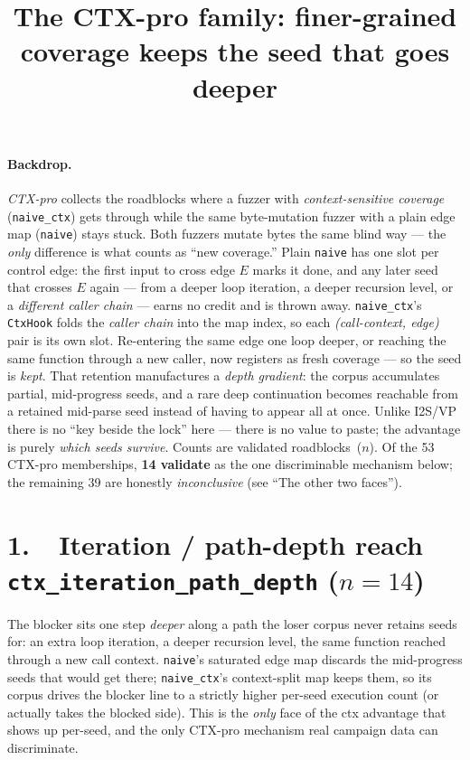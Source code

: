 \documentclass[11pt]{article}
\title{\textbf{The CTX-pro family: finer-grained coverage keeps the seed that goes deeper}}
\author{}
\date{}
\begin{document}
\maketitle
\vspace{-3em}

\paragraph{Backdrop.} \emph{CTX-pro} collects the roadblocks where a fuzzer with
\emph{context-sensitive coverage} (\texttt{naive\_ctx}) gets through while the
same byte-mutation fuzzer with a plain edge map (\texttt{naive}) stays stuck.
Both fuzzers mutate bytes the same blind way --- the \emph{only} difference is
what counts as ``new coverage.'' Plain \texttt{naive} has one slot per control
edge: the first input to cross edge $E$ marks it done, and any later seed that
crosses $E$ again --- from a deeper loop iteration, a deeper recursion level, or a
\emph{different caller chain} --- earns no credit and is thrown away.
\texttt{naive\_ctx}'s \texttt{CtxHook} folds the \emph{caller chain} into the
map index, so each \emph{(call-context, edge)} pair is its own slot. Re-entering
the same edge one loop deeper, or reaching the same function through a new
caller, now registers as fresh coverage --- so the seed is \emph{kept}. That
retention manufactures a \emph{depth gradient}: the corpus accumulates partial,
mid-progress seeds, and a rare deep continuation becomes reachable from a
retained mid-parse seed instead of having to appear all at once. Unlike I2S/VP
there is no ``key beside the lock'' here --- there is no value to paste; the
advantage is purely \emph{which seeds survive}. Counts are validated
roadblocks~($n$). Of the 53 CTX-pro memberships, \textbf{14 validate} as the one
discriminable mechanism below; the remaining 39 are honestly \emph{inconclusive}
(see ``The other two faces'').

\section*{1.\ \ Iteration / path-depth reach \hfill {\normalsize\texttt{ctx\_iteration\_path\_depth} ($n=14$)}}
The blocker sits one step \emph{deeper} along a path the loser corpus never
retains seeds for: an extra loop iteration, a deeper recursion level, the same
function reached through a new call context. \texttt{naive}'s saturated edge map
discards the mid-progress seeds that would get there; \texttt{naive\_ctx}'s
context-split map keeps them, so its corpus drives the blocker line to a strictly
higher per-seed execution count (or actually takes the blocked side). This is
the \emph{only} face of the ctx advantage that shows up per-seed, and the only
CTX-pro mechanism real campaign data can discriminate.
\end{document}
